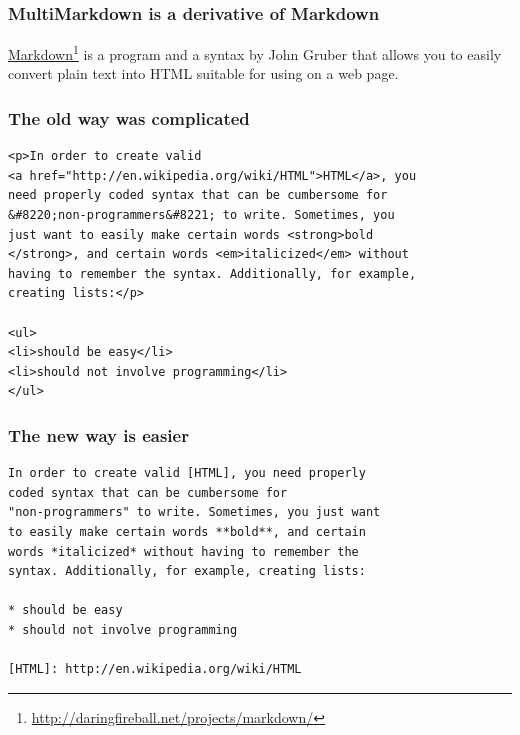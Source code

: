 \documentclass[ignorenonframetext,12pt,aspectratio=169]{beamer}
\subtitle{\mysubtitle}
\institute{\affiliation}
\date{\mydate}
\date[\mydate]{\mydate~ / \event }
\title[\mytitle\hspace{2em}\insertframenumber/
\inserttotalframenumber]{\mytitle}
\author{\myauthor}
\begin{document}
\maketitle

\begin{frame}[fragile]
\frametitle{MultiMarkdown is a derivative of Markdown}
\label{multimarkdownisaderivativeofmarkdown}

\href{http://daringfireball.net/projects/markdown/}{Markdown}\footnote{\href{http://daringfireball.net/projects/markdown/}{http://daringfireball.net/projects/markdown/}} is a program and a
syntax by John Gruber that allows you to easily convert plain text into HTML
suitable for using on a web page.

\end{frame}

\begin{frame}[fragile]
\frametitle{The old way was complicated}
\label{theoldwaywascomplicated}

\begin{verbatim}
<p>In order to create valid 
<a href="http://en.wikipedia.org/wiki/HTML">HTML</a>, you 
need properly coded syntax that can be cumbersome for 
&#8220;non-programmers&#8221; to write. Sometimes, you
just want to easily make certain words <strong>bold
</strong>, and certain words <em>italicized</em> without
having to remember the syntax. Additionally, for example,
creating lists:</p>

<ul>
<li>should be easy</li>
<li>should not involve programming</li>
</ul>
\end{verbatim}

\end{frame}

\begin{frame}[fragile]
\frametitle{The new way is easier}
\label{thenewwayiseasier}

\begin{verbatim}
In order to create valid [HTML], you need properly
coded syntax that can be cumbersome for 
"non-programmers" to write. Sometimes, you just want
to easily make certain words **bold**, and certain 
words *italicized* without having to remember the 
syntax. Additionally, for example, creating lists:

* should be easy
* should not involve programming

[HTML]: http://en.wikipedia.org/wiki/HTML
\end{verbatim}

\end{frame}
\end{document}
